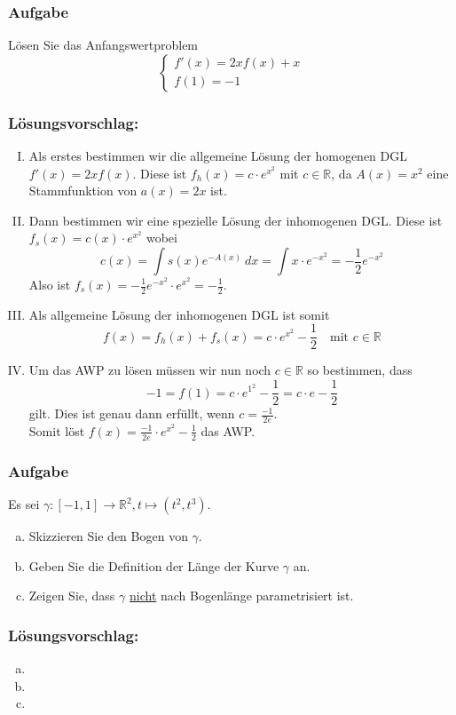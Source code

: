 \documentclass[a4paper,11pt]{scrartcl}
\newcounter{auf}
\newcommand{\Aufgabe}%
        {\addtocounter{auf}{1} \subsubsection*{\rmfamily  Aufgabe \theauf \hspace{1em}} }
\newcommand{\RR}{\mathbb{R}}
\begin{document}
\newpage
\Aufgabe
Lösen Sie das Anfangswertproblem
$$
\begin{cases} f'(x)=2xf(x)+x\\
f(1)=-1 \end{cases}
$$


\subsubsection*{Lösungsvorschlag:}
\begin{enumerate}[(I)]
\item Als erstes bestimmen wir die allgemeine Lösung der homogenen DGL $f'(x)=2xf(x)$. Diese ist $f_h(x)=c\cdot e^{x^2}$ mit $c \in \RR$, da $A(x)=x^2$ eine Stammfunktion von $a(x)=2x$ ist.
\item Dann bestimmen wir eine spezielle Lösung der inhomogenen DGL. Diese ist $f_s(x)=c(x)\cdot e^{x^2}$ wobei
$$
c(x)=\int s(x)e^{-A(x)}\ dx=\int x \cdot e^{-x^2}=-\frac{1}{2}e^{-x^2}
$$
Also ist $f_s(x)=-\frac{1}{2}e^{-x^2}\cdot e^{x^2} = -\frac{1}{2}$.
\item Als allgemeine Lösung der inhomogenen DGL ist somit
$$
f(x)=f_h(x)+f_s(x)=c\cdot e^{x^2}-\frac{1}{2} \quad \text{mit } c \in \RR
$$
\item Um das AWP zu lösen müssen wir nun noch $c \in \RR$ so bestimmen, dass
$$
-1=f(1)=c\cdot e^{1^2}-\frac{1}{2}=c\cdot e - \frac{1}{2}
$$
gilt. Dies ist genau dann erfüllt, wenn $c=\frac{-1}{2e}$.\\
Somit löst $f(x)=\frac{-1}{2e}\cdot e^{x^2}-\frac{1}{2}$ das AWP.
\end{enumerate}


\Aufgabe
Es sei $\gamma: [-1,1] \to \RR^2, t \mapsto (t^2,t^3)$.
\begin{enumerate}[a)]
\item Skizzieren Sie den Bogen von $\gamma$.
\item Geben Sie die Definition der Länge der Kurve $\gamma$ an.
\item Zeigen Sie, dass $\gamma$ \underline{nicht} nach Bogenlänge parametrisiert ist.
\end{enumerate}

\subsubsection*{Lösungsvorschlag:}
\begin{enumerate}[a)]
\item
\item
\item
\end{enumerate}
\end{document}
